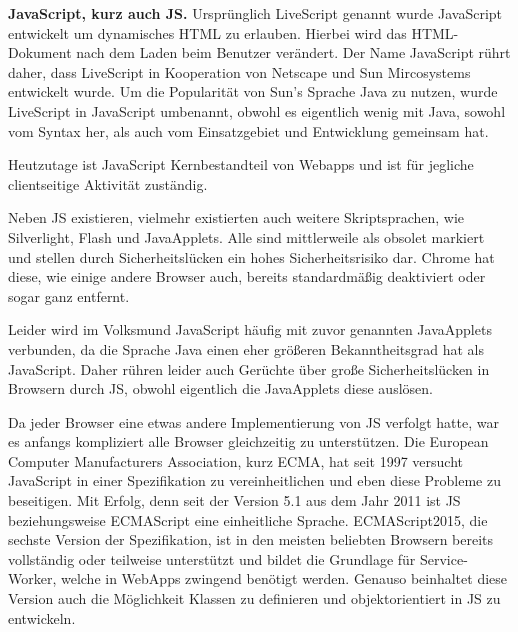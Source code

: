 \documentclass[a4paper,12pt,ngerman,listof=numbered]{scrartcl}      %
\let\oldcite\cite
\renewcommand{\cite}[1]{\textsuperscript{\oldcite{#1}}}
\newcommand{\spacer}{\par\bigskip\noindent}
\begin{document}
	\spacer\textbf{JavaScript, kurz auch JS.} Ursprünglich LiveScript genannt wurde JavaScript entwickelt um dynamisches HTML zu erlauben. Hierbei wird das HTML-Dokument nach dem Laden beim Benutzer verändert. Der Name JavaScript rührt daher, dass LiveScript in Kooperation von Netscape und Sun Mircosystems entwickelt wurde. Um die Popularität von Sun's Sprache Java zu nutzen, wurde LiveScript in JavaScript umbenannt, obwohl es eigentlich wenig mit Java, sowohl vom Syntax her, als auch vom Einsatzgebiet und Entwicklung gemeinsam hat. \cite{jsWiki}\par
	Heutzutage ist JavaScript Kernbestandteil von Webapps und ist für jegliche clientseitige Aktivität zuständig.\par
	Neben JS existieren, vielmehr existierten auch weitere Skriptsprachen, wie Silverlight, Flash und JavaApplets. Alle sind mittlerweile als obsolet markiert und stellen durch Sicherheitslücken ein hohes Sicherheitsrisiko dar.\cite{flashPlayer} Chrome hat diese, wie einige andere Browser auch, bereits standardmäßig deaktiviert oder sogar ganz entfernt.\cite{chromeNoFlash}\par
	Leider wird im Volksmund JavaScript häufig mit zuvor genannten JavaApplets verbunden, da die Sprache Java einen eher größeren Bekanntheitsgrad hat als JavaScript. Daher rühren leider auch Gerüchte über große Sicherheitslücken in Browsern durch JS, obwohl eigentlich die JavaApplets diese auslösen.\par
	Da jeder Browser eine etwas andere Implementierung von JS verfolgt hatte, war es anfangs kompliziert alle Browser gleichzeitig zu unterstützen. Die European Computer Manufacturers Association, kurz ECMA, hat seit 1997 versucht JavaScript in einer Spezifikation zu vereinheitlichen und eben diese Probleme zu beseitigen. Mit Erfolg, denn seit der Version 5.1 aus dem Jahr 2011 ist JS beziehungsweise ECMAScript eine einheitliche Sprache. ECMAScript2015, die sechste Version der Spezifikation, ist in den meisten beliebten Browsern bereits vollständig oder teilweise unterstützt und bildet die Grundlage für Service-Worker, welche in WebApps zwingend benötigt werden. Genauso beinhaltet diese Version auch die Möglichkeit Klassen zu definieren und objektorientiert in JS zu entwickeln.\cite{wikiECMA} \par
	
\end{document}
